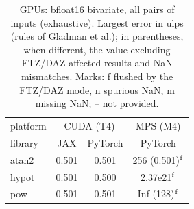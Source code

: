 \begin{table}
\centering
\begin{small}
\begin{tabular}{|l|cc|c|}
\hline
platform & \multicolumn{2}{c|}{CUDA (T4)} & \multicolumn{1}{c|}{MPS (M4)} \\
library & JAX & PyTorch & PyTorch \\ \hline
atan2 & 0.501 & 0.501 & 256 (0.501)$^{\rm f}$ \\
hypot & 0.501 & 0.500 & 2.37e21$^{\rm f}$ \\
pow & 0.501 & 0.501 & Inf (128)$^{\rm f}$ \\
\hline
\end{tabular}
\end{small}
\caption{GPUs: bfloat16 bivariate, all pairs of inputs (exhaustive). Largest error in ulps (rules of Gladman et al.); in parentheses, when different, the value excluding FTZ/DAZ-affected results and NaN mismatches. Marks: f flushed by the FTZ/DAZ mode, n spurious NaN, m missing NaN; -- not provided.}
\label{tab:bf16bigpu}
\end{table}
